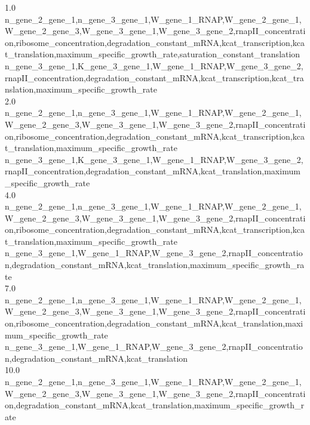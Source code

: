 \documentclass{article}
\begin{document}
\begin{landscape}
{\begin{minipage}{\textwidth}
1.0\\
n\_gene\_2\_gene\_1,n\_gene\_3\_gene\_1,W\_gene\_1\_RNAP,W\_gene\_2\_gene\_1,W\_gene\_2\_gene\_3,W\_gene\_3\_gene\_1,W\_gene\_3\_gene\_2,rnapII\_concentration,ribosome\_concentration,degradation\_constant\_mRNA,kcat\_transcription,kcat\_translation,maximum\_specific\_growth\_rate,saturation\_constant\_translation\\
n\_gene\_3\_gene\_1,K\_gene\_3\_gene\_1,W\_gene\_1\_RNAP,W\_gene\_3\_gene\_2,rnapII\_concentration,degradation\_constant\_mRNA,kcat\_transcription,kcat\_translation,maximum\_specific\_growth\_rate\\
2.0\\
n\_gene\_2\_gene\_1,n\_gene\_3\_gene\_1,W\_gene\_1\_RNAP,W\_gene\_2\_gene\_1,W\_gene\_2\_gene\_3,W\_gene\_3\_gene\_1,W\_gene\_3\_gene\_2,rnapII\_concentration,ribosome\_concentration,degradation\_constant\_mRNA,kcat\_transcription,kcat\_translation,maximum\_specific\_growth\_rate\\
n\_gene\_3\_gene\_1,K\_gene\_3\_gene\_1,W\_gene\_1\_RNAP,W\_gene\_3\_gene\_2,rnapII\_concentration,degradation\_constant\_mRNA,kcat\_translation,maximum\_specific\_growth\_rate\\
4.0\\
n\_gene\_2\_gene\_1,n\_gene\_3\_gene\_1,W\_gene\_1\_RNAP,W\_gene\_2\_gene\_1,W\_gene\_2\_gene\_3,W\_gene\_3\_gene\_1,W\_gene\_3\_gene\_2,rnapII\_concentration,ribosome\_concentration,degradation\_constant\_mRNA,kcat\_transcription,kcat\_translation,maximum\_specific\_growth\_rate\\
n\_gene\_3\_gene\_1,W\_gene\_1\_RNAP,W\_gene\_3\_gene\_2,rnapII\_concentration,degradation\_constant\_mRNA,kcat\_translation,maximum\_specific\_growth\_rate\\
7.0\\
n\_gene\_2\_gene\_1,n\_gene\_3\_gene\_1,W\_gene\_1\_RNAP,W\_gene\_2\_gene\_1,W\_gene\_2\_gene\_3,W\_gene\_3\_gene\_1,W\_gene\_3\_gene\_2,rnapII\_concentration,ribosome\_concentration,degradation\_constant\_mRNA,kcat\_translation,maximum\_specific\_growth\_rate\\
n\_gene\_3\_gene\_1,W\_gene\_1\_RNAP,W\_gene\_3\_gene\_2,rnapII\_concentration,degradation\_constant\_mRNA,kcat\_translation\\
10.0\\
n\_gene\_2\_gene\_1,n\_gene\_3\_gene\_1,W\_gene\_1\_RNAP,W\_gene\_2\_gene\_1,W\_gene\_2\_gene\_3,W\_gene\_3\_gene\_1,W\_gene\_3\_gene\_2,rnapII\_concentration,degradation\_constant\_mRNA,kcat\_translation,maximum\_specific\_growth\_rate\\

\end{minipage}}
\end{landscape}
\end{document}
